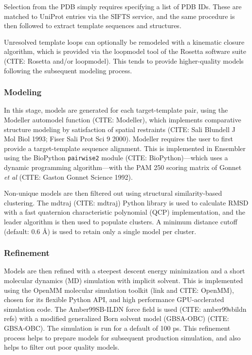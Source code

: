 \documentclass[aps,pre,twocolumn,nofootinbib,superscriptaddress,linenumbers]{revtex4-1}
\begin{document}
Selection from the PDB simply requires specifying a list of PDB IDs. These are
matched to UniProt entries via the SIFTS service, and the same procedure is
then followed to extract template sequences and structures.

Unresolved template loops can optionally be remodeled with a kinematic closure
algorithm, which is provided via the loopmodel tool of the Rosetta software
suite (CITE: Rosetta and/or loopmodel). This tends to provide higher-quality
models following the subsequent modeling process.

\subsubsection{Modeling}

In this stage, models are generated for each target-template pair, using the
Modeller automodel function (CITE: Modeller), which implements comparative
structure modeling by satisfaction of spatial restraints (CITE: Sali Blundell J
Mol Biol 1993; Fiser Sali Prot Sci 9 2000). Modeller requires the user to first
provide a target-template sequence alignment. This is implemented in Ensembler
using the BioPython {\tt pairwise2} module (CITE: BioPython)---which uses a
dynamic programming algorithm---with the PAM 250 scoring matrix of Gonnet
\textit{et al} (CITE: Gaston Gonnet Science 1992).

Non-unique models are then filtered out using structural similarity-based
clustering. The mdtraj (CITE: mdtraj) Python library is used to calculate RMSD
with a fast quaternion characteristic polynomial (QCP) implementation, and the
leader algorithm is then used to populate clusters. A minimum distance cutoff
(default: 0.6 \AA) is used to retain only a single model per cluster.

\subsubsection{Refinement}

Models are then refined with a steepest descent energy minimization and a short
molecular dynamics (MD) simulation with implicit solvent. This is implemented
using the OpenMM molecular simulation toolkit (link and CITE: OpenMM), chosen
for its flexible Python API, and high performance GPU-acclerated simulation
code. The Amber99SB-ILDN force field is used (CITE: amber99sbildn refs) with a
modified generalized Born solvent model (GBSA-OBC) (CITE: GBSA-OBC). The
simulation is run for a default of 100 ps. This refinement process helps to
prepare models for subsequent production simulation, and also helps to filter
out poor quality models.
\end{document}
